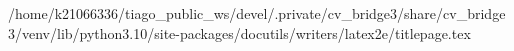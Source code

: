 /home/k21066336/tiago_public_ws/devel/.private/cv_bridge3/share/cv_bridge3/venv/lib/python3.10/site-packages/docutils/writers/latex2e/titlepage.tex